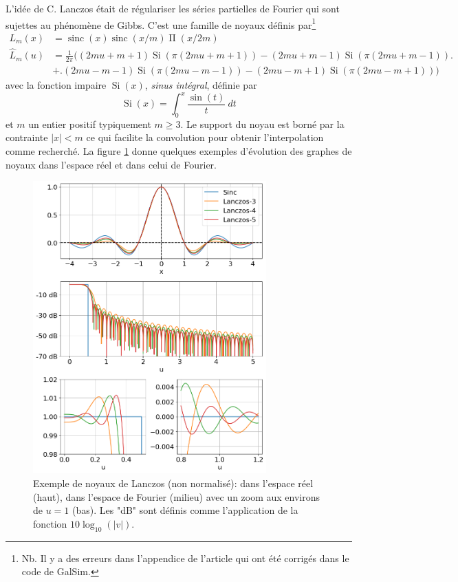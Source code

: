 \documentclass[11pt,twoside]{article}
\DeclareMathOperator{\sinc}{sinc}
\DeclareMathOperator{\boxcar}{{\mbox{$\Pi$}}}
\DeclareMathOperator{\Si}{Si}
\newcommand{\nn}{\nonumber}
\begin{document}
L'idée de C. Lanczos était de régulariser les séries partielles de Fourier qui sont sujettes au phénomène de Gibbs. C'est une famille de noyaux définis par\footnote{Nb. Il y a des erreurs dans l'appendice de l'article \cite{2014PASP..126..287B} qui ont été corrigés dans le code de \textsf{GalSim}.}  
\begin{align}
L_m(x) &= \sinc(x)\sinc(x/m) \boxcar(x/2m) \nn\\
\hat{L}_m(u) &= \frac{1}{2\pi}\Big(
(2mu+m+1)\Si(\pi (2mu+m+1) )- (2mu+m-1)\Si(\pi(2mu+m-1)) \Big. \nn \\
&+\Big. (2mu-m-1)\Si(\pi (2mu-m-1)) - (2mu-m+1)\Si(\pi (2mu-m+1))\Big)
\end{align}
avec  la fonction impaire $\Si(x)$, \textit{sinus intégral}, définie par
\begin{equation}
\Si(x) = \int_0^x \frac{\sin(t)}{t}\ dt
\end{equation}
et $m$ un entier positif typiquement $m\geq3$. Le support du noyau est borné par la contrainte $|x|<m$ ce qui facilite la convolution pour obtenir l'interpolation comme recherché. La figure \ref{fig-Lanczos-kernel} donne quelques exemples d'évolution des graphes de noyaux dans l'espace réel et dans celui de Fourier.
\begin{figure}
\centering
\includegraphics[width=0.8\textwidth]{fig5.png}
\caption{Exemple de noyaux de Lanczos (non normalisé): dans l'espace réel (haut), dans l'espace de Fourier (milieu) avec un zoom aux environs de $u=1$ (bas). Les "dB" sont définis comme l'application de la fonction $10\log_{10}(|v|)$.}
\label{fig-Lanczos-kernel}
\end{figure}
\end{document}
